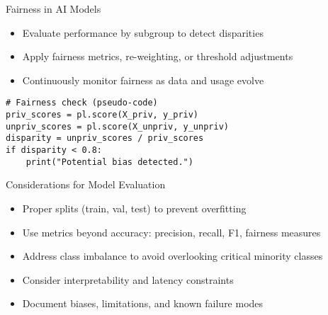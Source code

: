 \documentclass[aspectratio=169]{beamer}
\begin{document}

\begin{frame}[fragile]{Fairness in AI Models}
\begin{itemize}
\item Evaluate performance by subgroup to detect disparities
\item Apply fairness metrics, re-weighting, or threshold adjustments
\item Continuously monitor fairness as data and usage evolve
\end{itemize}

\begin{verbatim}
# Fairness check (pseudo-code)
priv_scores = pl.score(X_priv, y_priv)
unpriv_scores = pl.score(X_unpriv, y_unpriv)
disparity = unpriv_scores / priv_scores
if disparity < 0.8:
    print("Potential bias detected.")
\end{verbatim}
\end{frame}


\begin{frame}{Considerations for Model Evaluation}
\begin{itemize}
\item Proper splits (train, val, test) to prevent overfitting
\item Use metrics beyond accuracy: precision, recall, F1, fairness measures
\item Address class imbalance to avoid overlooking critical minority classes
\item Consider interpretability and latency constraints
\item Document biases, limitations, and known failure modes
\end{itemize}
\end{frame}
\end{document}

